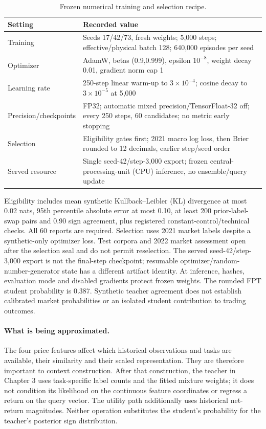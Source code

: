 \begin{table}[htbp]\centering\small{}
\caption[Numerical training and selection]{Frozen numerical training and selection recipe.}\label{tab:student}
\begin{tabular}{@{}P{.25\linewidth}P{.69\linewidth}@{}}\toprule
Setting & Recorded value\\\midrule
Training & Seeds 17/42/73, fresh weights; 5,000 steps; effective/physical batch 128; 640,000 episodes per seed\\
Optimizer & AdamW, betas (0.9,0.999), epsilon $10^{-8}$, weight decay 0.01, gradient norm cap 1\\
Learning rate & 250-step linear warm-up to $3\times10^{-4}$; cosine decay to $3\times10^{-5}$ at 5,000\\
Precision/checkpoints & FP32; automatic mixed precision/TensorFloat-32 off; every 250 steps, 60 candidates; no metric early stopping\\
Selection & Eligibility gates first; 2021 macro log loss, then Brier rounded to 12 decimals, earlier step/seed order\\
Served resource & Single seed-42/step-3,000 export; frozen central-processing-unit (CPU) inference, no ensemble/query update\\\bottomrule
\end{tabular}\end{table}

Eligibility includes mean synthetic Kullback--Leibler (KL) divergence at most 0.02 nats, 95th percentile
absolute error at most 0.10, at least 200 prior-label-swap pairs and 0.90
sign agreement, plus registered constant-control/technical checks. All
60 reports are required. Selection uses 2021 market labels despite a
synthetic-only optimizer loss. Test corpora and 2022 market assessment
open after the selection seal and do not permit reselection. The served
seed-42/step-3,000 export is not the final-step checkpoint; resumable
optimizer/random-number-generator state has a different artifact identity. At inference,
hashes, evaluation mode and disabled gradients protect frozen weights.
The rounded FPT student probability is 0.387. Synthetic
teacher agreement does not establish calibrated market probabilities or
an isolated student contribution to trading outcomes.

\paragraph{What is being approximated.}
The four price features affect which historical observations and tasks
are available, their similarity and their scaled representation. They
are therefore important to context construction. After that construction,
the teacher in Chapter 3 uses task-specific label counts and the fitted
mixture weights; it does not condition its likelihood on the continuous
feature coordinates or regress a return on the query vector. The utility
path additionally uses historical net-return magnitudes. Neither
operation substitutes the student's probability for the teacher's
posterior sign distribution.

